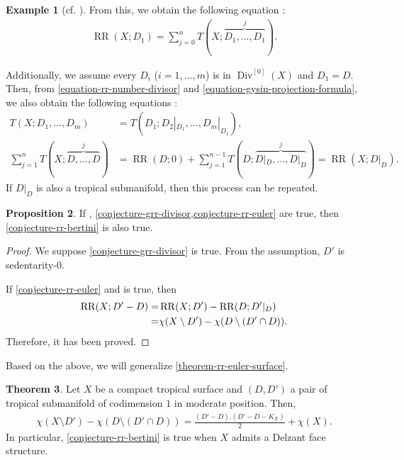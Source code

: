 \documentclass[a4paper,dvipdfmx,reqno,12pt]{amsart}
\theoremstyle{definition}
\newtheorem{theorem}{Theorem}[section]
\newtheorem{example}[theorem]{Example}
\newtheorem{proposition}[theorem]{Proposition}
\newcommand{\opn}[1]{\operatorname{#1}}
\numberwithin{equation}{section}
\begin{document}
\begin{example}[{cf. \cite[Chapter 13 Appendix]{MR2810322}}]
From this, we obtain the following equation
\cite[.(14)]{MR1335917}:
\begin{align}
\opn{RR}(X;D_1)=\sum_{j=0}^{n}T(X;\overbrace{D_1,\ldots,D_1}^{j}).
\end{align}

Additionally, we assume every $D_i$ ($i=1,\ldots,m$) is
in $\opn{Div}^{[0]}(X)$ and $D_1=D$.
Then, from 
\cref{equation-rr-number-divisor} and
\cref{equation-gysin-projection-formula},
we also obtain the following equations \cite[Theorem 11.2.1]{MR1335917}:
\begin{align}
T(X;D_1,\ldots,D_m)&=T(D_1;D_2|_{D_1},\ldots,D_m|_{D_1}), \\
\sum_{j=1}^{n}T(X;\overbrace{D,\ldots,D}^{j})
&=\opn{RR}(D;0)+\sum_{j=1}^{n-1}T(D;\overbrace{D|_D,\ldots,D|_{D}}^{j})
=\opn{RR}(X;D|_D).
\label{equation-rr-reduction}
\end{align}
If $D|_D$ is also a tropical submanifold,
then this process can be repeated.
\end{example}

\begin{proposition}
If \label{proposition-euler-to-bertini}
\cite[Conjecture 6.13]{demedrano2023chern},
\cref{conjecture-grr-divisor,conjecture-rr-euler}
are true, then \cref{conjecture-rr-bertini} is also true. 
\end{proposition}

\begin{proof}
We suppose \cref{conjecture-grr-divisor} is true.
From the assumption, 
$D'$ is sedentarity-$0$. 


If \cref{conjecture-rr-euler} and 
\cite[Conjecture 6.13]{demedrano2023chern} is true,
then
\begin{align}
\opn{RR}(X;D'-D)=&\opn{RR}(X;D')-
\opn{RR}(D;D'|_{D}) \notag \\
=&\chi(X\setminus D')-\chi(D\setminus (D'\cap D)). \notag
\end{align}
Therefore, it has been proved.
\end{proof}

Based on the above, we will generalize
\cref{theorem-rr-euler-surface}.

\begin{theorem}
\label{theorem-rr-bertini-surface}
Let $X$ be a compact tropical surface
and $(D,D')$ a pair of tropical submanifold of
codimension $1$ in moderate position. Then,
\begin{align}
\chi(X\setminus D')-\chi(D\setminus (D'\cap D))
=\frac{(D'-D).(D'-D-K_X)}{2}+\chi(X).
\end{align}
In particular, \cref{conjecture-rr-bertini} is true 
when $X$ admits a Delzant face structure.
\end{theorem}
\end{document}
